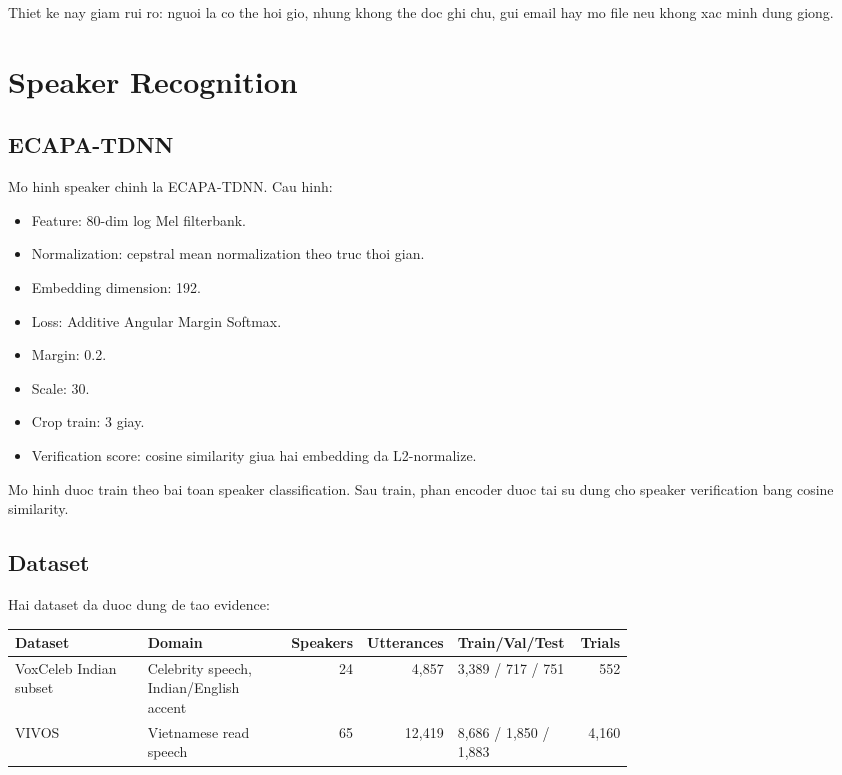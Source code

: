 \documentclass[12pt,a4paper]{article}
\begin{document}
Thiet ke nay giam rui ro: nguoi la co the hoi gio, nhung khong the doc ghi chu,
gui email hay mo file neu khong xac minh dung giong.

\section{Speaker Recognition}

\subsection{ECAPA-TDNN}

Mo hinh speaker chinh la ECAPA-TDNN. Cau hinh:

\begin{itemize}
  \item Feature: 80-dim log Mel filterbank.
  \item Normalization: cepstral mean normalization theo truc thoi gian.
  \item Embedding dimension: 192.
  \item Loss: Additive Angular Margin Softmax.
  \item Margin: 0.2.
  \item Scale: 30.
  \item Crop train: 3 giay.
  \item Verification score: cosine similarity giua hai embedding da L2-normalize.
\end{itemize}

Mo hinh duoc train theo bai toan speaker classification. Sau train, phan encoder
duoc tai su dung cho speaker verification bang cosine similarity.

\subsection{Dataset}

Hai dataset da duoc dung de tao evidence:

\begin{longtable}{p{0.26\linewidth}p{0.26\linewidth}r r p{0.2\linewidth} r}
\toprule
\textbf{Dataset} & \textbf{Domain} & \textbf{Speakers} & \textbf{Utterances} & \textbf{Train/Val/Test} & \textbf{Trials} \\
\midrule
\endhead
VoxCeleb Indian subset & Celebrity speech, Indian/English accent & 24 & 4,857 & 3,389 / 717 / 751 & 552 \\
VIVOS & Vietnamese read speech & 65 & 12,419 & 8,686 / 1,850 / 1,883 & 4,160 \\
\bottomrule
\end{longtable}
\end{document}
